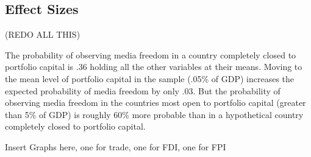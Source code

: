 \documentclass[12pt,a4paper]{article}\usepackage[]{graphicx}\usepackage[]{color}
\begin{document}


\subsection{Effect Sizes}

(REDO ALL THIS)


The probability of observing media freedom in a country completely closed to portfolio capital is .36 holding all the other variables at their means. Moving to the mean level of portfolio capital in the sample (.05\% of GDP) increases the expected probability of media freedom by only .03. But the probability of observing media freedom in the countries most open to portfolio capital (greater than 5\% of GDP) is roughly 60\% more probable than in a hypothetical country completely closed to portfolio capital.

Insert Graphs here, one for trade, one for FDI, one for FPI
\end{document}

